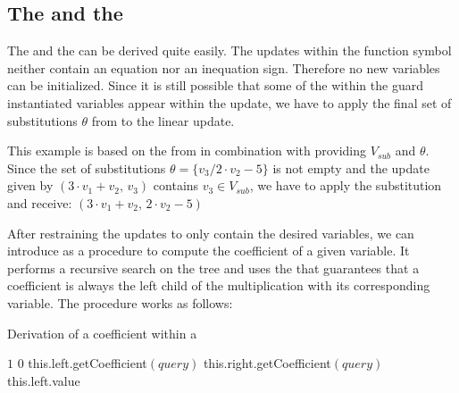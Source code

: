 \subsection{The \updatematrix and the \updateconstants}
\label{sec:derivation-update}
The \updatematrix and the \updateconstants can be derived quite easily. The updates within the function symbol neither contain an equation nor an inequation sign. Therefore no new variables can be initialized. Since it is still possible that some of the within the guard instantiated variables appear within the update, we have to apply the final set of substitutions $\theta$ from  to the linear update. 

\begin{example}
	\label{ex:derivation-update-sub}
	This example is based on the \its from  in combination with  providing $V_{sub}$ and $\theta$. \newline
	Since the set of substitutions $\theta=\{v_3/2\cdot v_2-5\}$ is not empty and the update given by\newline
	\hspace*{.4\textwidth}$(3\cdot v_1+v_2\text{, } v_3)$\newline
	contains $v_3 \in V_{sub}$, we have to apply the substitution and receive:\newline
	\hspace*{.37\textwidth}$(3\cdot v_1+v_2\text{, }2\cdot v_2-5)$
\end{example}

After restraining the updates to only contain the desired variables, we can introduce  as a procedure to compute the coefficient of a given variable. It performs a recursive search on the tree and uses the \stdLinInt that guarantees that a coefficient is always the left child of the multiplication with its corresponding variable. The procedure works as follows:
\begin{algorithm}[H]
	\caption{Derivation of a coefficient within a \rpntree}
	\label{algo:coefficient}
	\begin{algorithmic}[1]
				\State \Return $1$
			 
				\State \Return $0$
			\EndIf
			\State
			 
					\State \Return this.left.getCoefficient$(query)$
				\Else
					\State \Return this.right.getCoefficient$(query)$
				\EndIf
			\EndIf
			 
					\State \Return this.left.value
				\EndIf				
			\EndIf
		\EndFunction
	\end{algorithmic}
\end{algorithm}

